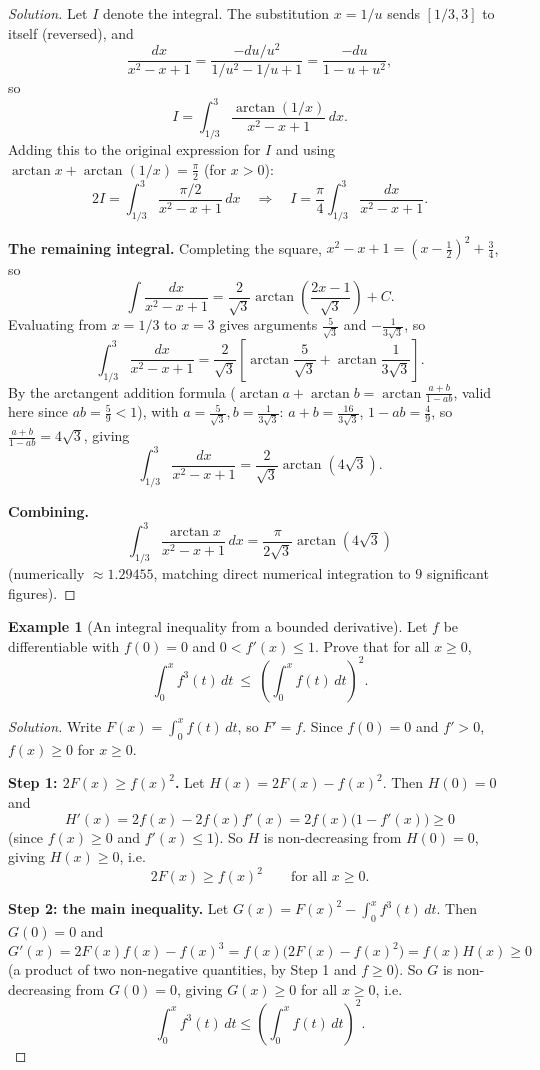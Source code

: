 \documentclass[11pt]{article}
\theoremstyle{definition}
\newtheorem{example}{Example}[section]
\begin{document}
\begin{proof}[Solution]
Let $I$ denote the integral. The substitution $x=1/u$ sends $[1/3,3]$ to itself (reversed), and
\[
\frac{dx}{x^2-x+1}=\frac{-du/u^2}{1/u^2-1/u+1}=\frac{-du}{1-u+u^2},
\]
so
\[
I=\int_{1/3}^3\frac{\arctan(1/x)}{x^2-x+1}\,dx.
\]
Adding this to the original expression for $I$ and using $\arctan x+\arctan(1/x)=\tfrac\pi2$ (for $x>0$):
\[
2I=\int_{1/3}^3\frac{\pi/2}{x^2-x+1}\,dx\quad\Longrightarrow\quad I=\frac\pi4\int_{1/3}^3\frac{dx}{x^2-x+1}.
\]

\textbf{The remaining integral.} Completing the square, $x^2-x+1=(x-\tfrac12)^2+\tfrac34$, so
\[
\int\frac{dx}{x^2-x+1}=\frac2{\sqrt3}\arctan\!\left(\frac{2x-1}{\sqrt3}\right)+C.
\]
Evaluating from $x=1/3$ to $x=3$ gives arguments $\tfrac{5}{\sqrt3}$ and $-\tfrac1{3\sqrt3}$, so
\[
\int_{1/3}^3\frac{dx}{x^2-x+1}=\frac2{\sqrt3}\left[\arctan\!\frac5{\sqrt3}+\arctan\!\frac1{3\sqrt3}\right].
\]
By the arctangent addition formula ($\arctan a+\arctan b=\arctan\frac{a+b}{1-ab}$, valid here since $ab=\tfrac59<1$), with $a=\tfrac5{\sqrt3},b=\tfrac1{3\sqrt3}$: $a+b=\tfrac{16}{3\sqrt3}$, $1-ab=\tfrac49$, so $\frac{a+b}{1-ab}=4\sqrt3$, giving
\[
\int_{1/3}^3\frac{dx}{x^2-x+1}=\frac2{\sqrt3}\arctan(4\sqrt3).
\]

\textbf{Combining.}
\[
\boxed{\int_{1/3}^3\frac{\arctan x}{x^2-x+1}\,dx=\frac\pi{2\sqrt3}\arctan(4\sqrt3)}
\]
(numerically $\approx1.29455$, matching direct numerical integration to $9$ significant figures).
\end{proof}

\begin{example}[An integral inequality from a bounded derivative]
Let $f$ be differentiable with $f(0)=0$ and $0<f'(x)\le1$. Prove that for all $x\ge0$,
\[
\int_0^x f^3(t)\,dt\ \le\ \left(\int_0^x f(t)\,dt\right)^2.
\]
\end{example}

\begin{proof}[Solution]
Write $F(x)=\int_0^xf(t)\,dt$, so $F'=f$. Since $f(0)=0$ and $f'>0$, $f(x)\ge0$ for $x\ge0$.

\textbf{Step 1: $2F(x)\ge f(x)^2$.} Let $H(x)=2F(x)-f(x)^2$. Then $H(0)=0$ and
\[
H'(x)=2f(x)-2f(x)f'(x)=2f(x)\bigl(1-f'(x)\bigr)\ge0
\]
(since $f(x)\ge0$ and $f'(x)\le1$). So $H$ is non-decreasing from $H(0)=0$, giving $H(x)\ge0$, i.e.\
\[
2F(x)\ge f(x)^2\qquad\text{for all }x\ge0.
\]

\textbf{Step 2: the main inequality.} Let $G(x)=F(x)^2-\int_0^xf^3(t)\,dt$. Then $G(0)=0$ and
\[
G'(x)=2F(x)f(x)-f(x)^3=f(x)\bigl(2F(x)-f(x)^2\bigr)=f(x)H(x)\ge0
\]
(a product of two non-negative quantities, by Step 1 and $f\ge0$). So $G$ is non-decreasing from $G(0)=0$, giving $G(x)\ge0$ for all $x\ge0$, i.e.\
\[
\boxed{\int_0^xf^3(t)\,dt\le\left(\int_0^xf(t)\,dt\right)^2}.
\]
\end{proof}
\end{document}

